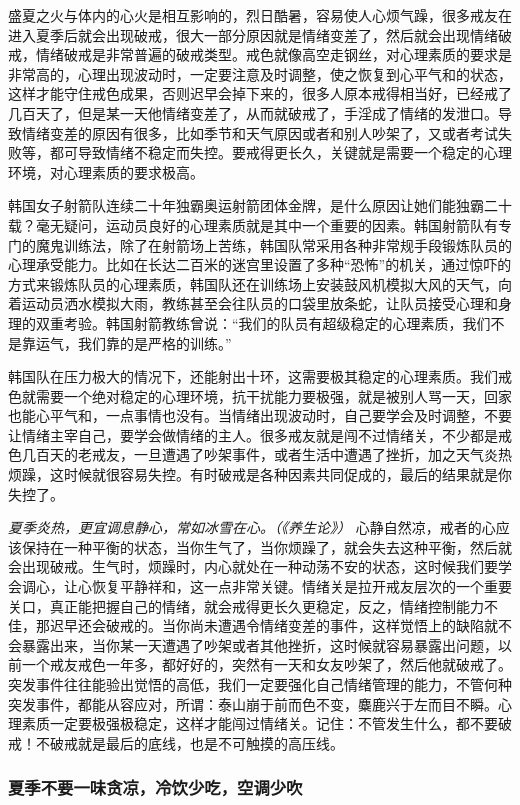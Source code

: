 盛夏之火与体内的心火是相互影响的，烈日酷暑，容易使人心烦气躁，很多戒友在进入夏季后就会出现破戒，很大一部分原因就是情绪变差了，然后就会出现情绪破戒，情绪破戒是非常普遍的破戒类型。戒色就像高空走钢丝，对心理素质的要求是非常高的，心理出现波动时，一定要注意及时调整，使之恢复到心平气和的状态，这样才能守住戒色成果，否则迟早会掉下来的，很多人原本戒得相当好，已经戒了几百天了，但是某一天他情绪变差了，从而就破戒了，手淫成了情绪的发泄口。导致情绪变差的原因有很多，比如季节和天气原因或者和别人吵架了，又或者考试失败等，都可导致情绪不稳定而失控。要戒得更长久，关键就是需要一个稳定的心理环境，对心理素质的要求极高。

韩国女子射箭队连续二十年独霸奥运射箭团体金牌，是什么原因让她们能独霸二十载？毫无疑问，运动员良好的心理素质就是其中一个重要的因素。韩国射箭队有专门的魔鬼训练法，除了在射箭场上苦练，韩国队常采用各种非常规手段锻炼队员的心理承受能力。比如在长达二百米的迷宫里设置了多种“恐怖”的机关，通过惊吓的方式来锻炼队员的心理素质，韩国队还在训练场上安装鼓风机模拟大风的天气，向着运动员洒水模拟大雨，教练甚至会往队员的口袋里放条蛇，让队员接受心理和身理的双重考验。韩国射箭教练曾说：“我们的队员有超级稳定的心理素质，我们不是靠运气，我们靠的是严格的训练。”

韩国队在压力极大的情况下，还能射出十环，这需要极其稳定的心理素质。我们戒色就需要一个绝对稳定的心理环境，抗干扰能力要极强，就是被别人骂一天，回家也能心平气和，一点事情也没有。当情绪出现波动时，自己要学会及时调整，不要让情绪主宰自己，要学会做情绪的主人。很多戒友就是闯不过情绪关，不少都是戒色几百天的老戒友，一旦遭遇了吵架事件，或者生活中遭遇了挫折，加之天气炎热烦躁，这时候就很容易失控。有时破戒是各种因素共同促成的，最后的结果就是你失控了。

\textit{夏季炎热，更宜调息静心，常如冰雪在心。（《养生论》）} 心静自然凉，戒者的心应该保持在一种平衡的状态，当你生气了，当你烦躁了，就会失去这种平衡，然后就会出现破戒。生气时，烦躁时，内心就处在一种动荡不安的状态，这时候我们要学会调心，让心恢复平静祥和，这一点非常关键。情绪关是拉开戒友层次的一个重要关口，真正能把握自己的情绪，就会戒得更长久更稳定，反之，情绪控制能力不佳，那迟早还会破戒的。当你尚未遭遇令情绪变差的事件，这样觉悟上的缺陷就不会暴露出来，当你某一天遭遇了吵架或者其他挫折，这时候就容易暴露出问题，以前一个戒友戒色一年多，都好好的，突然有一天和女友吵架了，然后他就破戒了。突发事件往往能验出觉悟的高低，我们一定要强化自己情绪管理的能力，不管何种突发事件，都能从容应对，所谓：泰山崩于前而色不变，麋鹿兴于左而目不瞬。心理素质一定要极强极稳定，这样才能闯过情绪关。记住：不管发生什么，都不要破戒！不破戒就是最后的底线，也是不可触摸的高压线。

\subsubsection{夏季不要一味贪凉，冷饮少吃，空调少吹}

